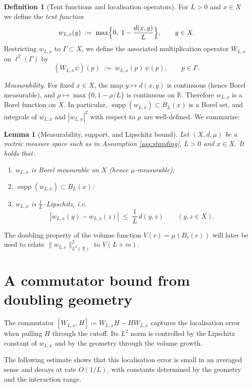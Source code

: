 \documentclass[11pt]{article}
\newtheorem{lemma}[theorem]{Lemma}
\theoremstyle{definition}
\newtheorem{definition}[theorem]{Definition}
\newcommand{\R}{\mathbb{R}}
\newcommand{\supp}{\operatorname{supp}}
\begin{document}
\begin{definition}[Tent functions and localisation operators]
\label{def:tent}
For $L>0$ and $x\in X$ we define the \emph{tent function}
\[
  w_{L,x}(y)
  \;:=\;
  \max\Bigl\{0,\; 1-\frac{d(x,y)}{L}\Bigr\},
  \qquad y\in X.
\]
Restricting $w_{L,x}$ to $\Gamma\subset X$, we define the associated
multiplication operator $W_{L,x}$ on $\ell^2(\Gamma)$ by
\[
  (W_{L,x}\psi)(p) \;:=\; w_{L,x}(p)\,\psi(p),
  \qquad p\in\Gamma.
\]
\end{definition}

\noindent\textit{Measurability.}
For fixed $x\in X$, the map $y\mapsto d(x,y)$ is continuous (hence Borel
measurable), and $\rho\mapsto \max\{0,1-\rho/L\}$ is continuous on $\R$.
Therefore $w_{L,x}$ is a Borel function on $X$. In particular,
$\supp(w_{L,x})\subset B_L(x)$ is a Borel set, and integrals of $w_{L,x}$ and
$|w_{L,x}|^2$ with respect to $\mu$ are well-defined. We summarize:

\begin{lemma}[Measurability, support, and Lipschitz bound]
\label{lem:tent-regularity}
Let $(X,d,\mu)$ be a metric measure space such as in Assumption \ref{ass:standing}, $L>0$ and $x\in X$. It holds that:
\begin{enumerate}[leftmargin=2em]
\item[(i)] $w_{L,x}$ is Borel measurable on $X$ (hence $\mu$-measurable);
\item[(ii)] $\supp(w_{L,x})\subset B_L(x)$;
\item[(iii)] $w_{L,x}$ is $\tfrac1L$--Lipschitz, i.e.
\[
  |w_{L,x}(y)-w_{L,x}(z)|
  \;\le\;\frac{1}{L}\,d(y,z)
  \qquad (y,z\in X).
\]
\end{enumerate}
\end{lemma}


\medskip

The doubling property of the volume function $V(r)=\mu(B_r(e))$ will later be
used to relate $\|w_{L,e}\|_{L^2(X)}^2$ to $V(L+m)$.

\section{A commutator bound from doubling geometry}

The commutator $[W_{L,x},H] \coloneqq W_{L,x}H-HW_{L,x}$ captures the localisation error when pulling $H$ through the cutoff. Its $L^2$ norm is controlled by the Lipschitz constant of $w_{L,x}$ and by the geometry through the volume growth.

The following estimate shows that this localisation error is small in an averaged
sense and decays at rate $O(1/L)$, with constants determined by the geometry and
the interaction range.
\end{document}
